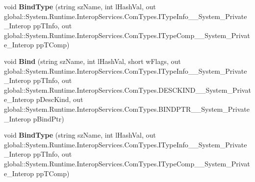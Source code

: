 \begin{DoxyCompactItemize}
\mbox{\label{interface_system_1_1_runtime_1_1_interop_services_1_1_com_types_1_1_i_type_comp_____system___private___interop_ae21c9bf57bcae58539d1325a4f854d27}} 
void {\bfseries Bind\+Type} (string sz\+Name, int l\+Hash\+Val, out global\+::\+System.\+Runtime.\+Interop\+Services.\+Com\+Types.\+I\+Type\+Info\+\_\+\+\_\+\+System\+\_\+\+Private\+\_\+\+Interop pp\+T\+Info, out global\+::\+System.\+Runtime.\+Interop\+Services.\+Com\+Types.\+I\+Type\+Comp\+\_\+\+\_\+\+System\+\_\+\+Private\+\_\+\+Interop pp\+T\+Comp)
\item 
\mbox{\label{interface_system_1_1_runtime_1_1_interop_services_1_1_com_types_1_1_i_type_comp_____system___private___interop_a18710cd4245d22d84924e20843c1a5b4}} 
void {\bfseries Bind} (string sz\+Name, int l\+Hash\+Val, short w\+Flags, out global\+::\+System.\+Runtime.\+Interop\+Services.\+Com\+Types.\+I\+Type\+Info\+\_\+\+\_\+\+System\+\_\+\+Private\+\_\+\+Interop pp\+T\+Info, out global\+::\+System.\+Runtime.\+Interop\+Services.\+Com\+Types.\+D\+E\+S\+C\+K\+I\+N\+D\+\_\+\+\_\+\+System\+\_\+\+Private\+\_\+\+Interop p\+Desc\+Kind, out global\+::\+System.\+Runtime.\+Interop\+Services.\+Com\+Types.\+B\+I\+N\+D\+P\+T\+R\+\_\+\+\_\+\+System\+\_\+\+Private\+\_\+\+Interop p\+Bind\+Ptr)
\item 
\mbox{\label{interface_system_1_1_runtime_1_1_interop_services_1_1_com_types_1_1_i_type_comp_____system___private___interop_ae21c9bf57bcae58539d1325a4f854d27}} 
void {\bfseries Bind\+Type} (string sz\+Name, int l\+Hash\+Val, out global\+::\+System.\+Runtime.\+Interop\+Services.\+Com\+Types.\+I\+Type\+Info\+\_\+\+\_\+\+System\+\_\+\+Private\+\_\+\+Interop pp\+T\+Info, out global\+::\+System.\+Runtime.\+Interop\+Services.\+Com\+Types.\+I\+Type\+Comp\+\_\+\+\_\+\+System\+\_\+\+Private\+\_\+\+Interop pp\+T\+Comp)
\item 
\mbox{\label{interface_system_1_1_runtime_1_1_interop_services_1_1_com_types_1_1_i_type_comp_____system___private___interop_a18710cd4245d22d84924e20843c1a5b4}} 

\end{DoxyCompactItemize}
